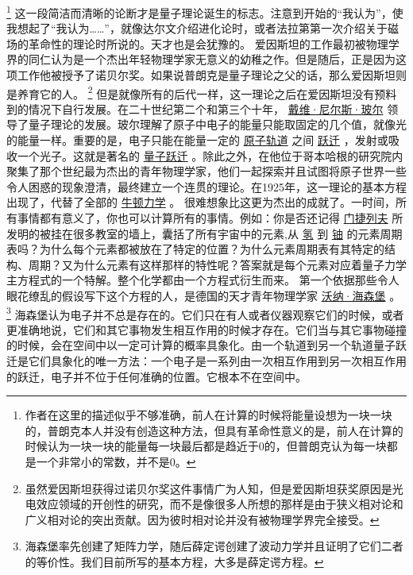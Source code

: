 \footnote[1]
{
作者在这里的描述似乎不够准确，前人在计算的时候将能量设想为一块一块的，普朗克本人并没有创造这种方法，但具有革命性意义的是，前人在计算的时候认为一块一块的能量每一块最后都是趋近于0的，但普朗克认为每一块都是一个非常小的常数，并不是0。
}
    这一段简洁而清晰的论断才是量子理论诞生的标志。注意到开始的“我认为”，使我想起了“我认为……”，就像达尔文介绍进化论时，或者法拉第第一次介绍关于磁场的革命性的理论时所说的。天才也是会犹豫的。
    爱因斯坦的工作最初被物理学界的同仁认为是一个杰出年轻物理学家无意义的幼稚之作。但是随后，正是因为这项工作他被授予了诺贝尔奖。如果说普朗克是量子理论之父的话，那么爱因斯坦则是养育它的人。
\footnote[2]
{

虽然爱因斯坦获得过诺贝尔奖这件事情广为人知，但是爱因斯坦获奖原因是光电效应领域的开创性的研究，而不是像很多人所想的那样是由于狭义相对论和广义相对论的突出贡献。因为彼时相对论并没有被物理学界完全接受。
}
    但是就像所有的后代一样，这一理论之后在爱因斯坦没有预料到的情况下自行发展。在二十世纪第二个和第三个十年，
\href{https://en.wikipedia.org/wiki/Niels Bohr}{戴维·尼尔斯·玻尔}
领导了量子理论的发展。玻尔理解了原子中电子的能量只能取固定的几个值，就像光的能量一样。重要的是，电子只能在能量一定的
\href{http://toyhouse.cc/wiki/index.php/原子轨道}{原子轨道}
之间
\href{http://toyhouse.cc/wiki/index.php/跃迁}{跃迁}
，发射或吸收一个光子。这就是著名的
\href{http://toyhouse.cc/wiki/index.php/量子跃迁}{量子跃迁}
。除此之外，在他位于哥本哈根的研究院内聚集了那个世纪最为杰出的青年物理学家，他们一起探索并且试图将原子世界一些令人困惑的现象澄清，最终建立一个连贯的理论。在1925年，这一理论的基本方程出现了，代替了全部的
\href{http://toyhouse.cc/wiki/index.php/牛顿力学}{牛顿力学}
。
    很难想象比这更为杰出的成就了。一时间，所有事情都有意义了，你也可以计算所有的事情。例如：你是否还记得
\href{https://en.wikipedia.org/wiki/Dmitri Mendeleev}{门捷列夫}
所发明的被挂在很多教室的墙上，囊括了所有宇宙中的元素,从
\href{http://toyhouse.cc/wiki/index.php/氢}{氢}
到
\href{http://toyhouse.cc/wiki/index.php/铀}{铀}
的元素周期表吗？为什么每个元素都被放在了特定的位置？为什么元素周期表有其特定的结构、周期？又为什么元素有这样那样的特性呢？答案就是每个元素对应着量子力学主方程式的一个特解。整个化学都由一个方程式衍生而来。
    第一个依据那些令人眼花缭乱的假设写下这个方程的人，是德国的天才青年物理学家
\href{https://en.wikipedia.org/wiki/沃纳·海森堡}{沃纳·海森堡}
。
\footnote[3]
{
海森堡率先创建了矩阵力学，随后薛定谔创建了波动力学并且证明了它们二者的等价性。我们目前所写的基本方程，大多是薛定谔方程。
}
    海森堡认为电子并不总是存在的。它们只在有人或者仪器观察它们的时候，或者更准确地说，它们和其它事物发生相互作用的时候才存在。它们当与其它事物碰撞的时候，会在空间中以一定可计算的概率具象化。由一个轨道到另一个轨道量子跃迁是它们具象化的唯一方法：一个电子是一系列由一次相互作用到另一次相互作用的跃迁，电子并不位于任何准确的位置。它根本不在空间中。
